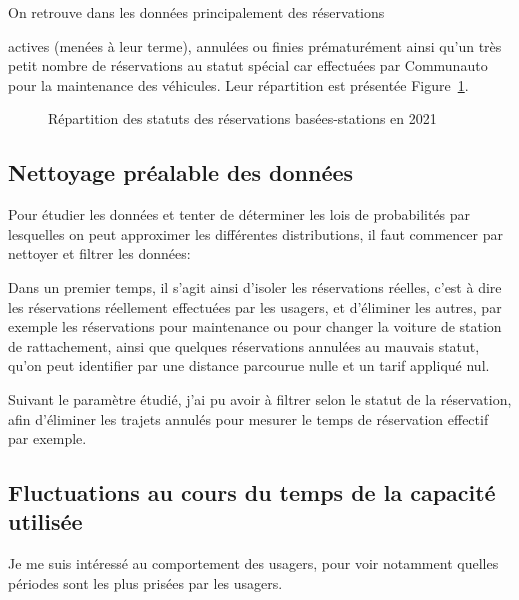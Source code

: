 \documentclass[12pt,a4paper]{article}
\newcommand{\1}[1]{\mathbbm{1}_{\{#1\}} }
\theoremstyle{definition}
\begin{document}
On retrouve dans les données principalement des réservations {actives (menées à leur terme), annulées ou finies prématurément ainsi qu'un très petit nombre de réservations au statut spécial car effectuées par Communauto pour la maintenance des véhicules. Leur répartition est présentée Figure~\ref{Répartition}.

\begin{figure}[!h]
\centering
{}
\caption{Répartition des statuts des réservations basées-stations en 2021}
\label{Répartition}
\end{figure}
 	
 	
\subsection{Nettoyage préalable des  données}
Pour étudier les données et tenter de déterminer les lois de probabilités par lesquelles on peut approximer les différentes distributions, il faut commencer par nettoyer et filtrer les données:

Dans un premier temps, il s'agit ainsi d'isoler les réservations réelles, c'est à dire les réservations réellement effectuées par les usagers, et d'éliminer les autres, par exemple les réservations pour maintenance ou pour changer la voiture de station de rattachement, ainsi que quelques réservations annulées au mauvais statut, qu'on peut identifier par une distance parcourue nulle et un tarif appliqué nul.
	

Suivant le paramètre étudié, j'ai pu avoir à filtrer selon le statut de la réservation, afin d'éliminer les trajets annulés pour mesurer le temps de réservation effectif par exemple.



\subsection{Fluctuations au cours du temps de la capacité utilisée}


Je me suis intéressé au comportement des usagers, pour voir notamment quelles périodes sont les plus prisées par les usagers.

}
\end{document}
